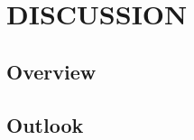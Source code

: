 %
%

\chapter{DISCUSSION}
\label{chp:wob-disc}
\section{Overview}
\label{sec:wob-disc-overview}
\section{Outlook}
\label{sec-wob-disc-outlook}
